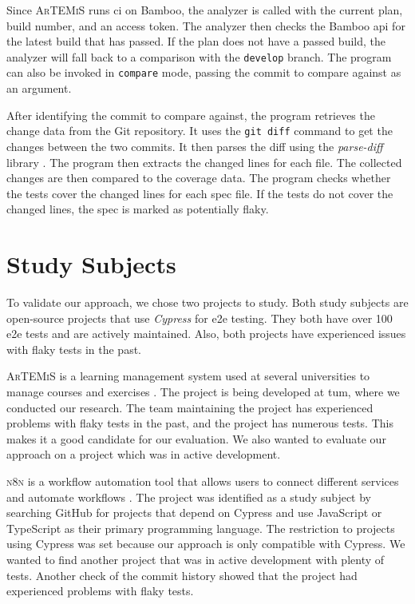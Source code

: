 Since \textsc{ArTEMiS} runs \ac{ci} on Bamboo, the analyzer is called with the current plan, build number, and an access token.
The analyzer then checks the Bamboo \ac{api} for the latest build that has passed.
If the plan does not have a passed build, the analyzer will fall back to a comparison with the \texttt{develop} branch.
The program can also be invoked in \texttt{compare} mode, passing the commit to compare against as an argument.

After identifying the commit to compare against, the program retrieves the change data from the Git repository.
It uses the \texttt{git diff} command to get the changes between the two commits.
It then parses the diff using the \textit{parse-diff} library \autocite{todyshev_parse-diff_2023}.
The program then extracts the changed lines for each file.
The collected changes are then compared to the coverage data.
The program checks whether the tests cover the changed lines for each spec file.
If the tests do not cover the changed lines, the spec is marked as potentially flaky.

\section{Study Subjects}
To validate our approach, we chose two projects to study.
Both study subjects are open-source projects that use \textit{Cypress} for \ac{e2e} testing.
They both have over 100 \ac{e2e} tests and are actively maintained.
Also, both projects have experienced issues with flaky tests in the past.

\textsc{ArTEMiS} is a learning management system used at several universities to manage courses and exercises \autocite{krusche_artemis_2018}.
The project is being developed at \ac{tum}, where we conducted our research.
The team maintaining the project has experienced problems with flaky tests in the past, and the project has numerous tests.
This makes it a good candidate for our evaluation.
We also wanted to evaluate our approach on a project which was in active development.

\textsc{n8n} is a workflow automation tool that allows users to connect different services and automate workflows \autocite{noauthor_n8n_2023}.
The project was identified as a study subject by searching GitHub for projects that depend on Cypress and use JavaScript or TypeScript as their primary programming language.
The restriction to projects using Cypress was set because our approach is only compatible with Cypress.
We wanted to find another project that was in active development with plenty of tests.
Another check of the commit history showed that the project had experienced problems with flaky tests.

